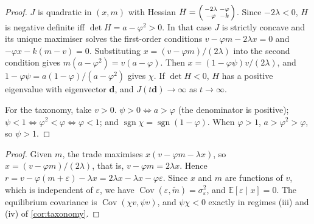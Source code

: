 \documentclass{article}
\theoremstyle{plain}
\theoremstyle{definition}
\theoremstyle{remark}
\newcommand{\E}{\mathbb{E}}
\DeclareMathOperator{\sgn}{sgn}
\DeclareMathOperator{\Cov}{Cov}
\begin{document}
\thmspeech*
\begin{proof}
$J$ is quadratic in $(x,m)$ with Hessian $H=\begin{psmallmatrix}-2\lambda&-\varphi\\-\varphi&-k\end{psmallmatrix}$. Since $-2\lambda<0$, $H$ is negative definite iff $\det H=a-\varphi^2>0$. In that case $J$ is strictly concave and its unique maximiser solves the first-order conditions $v-\varphi m-2\lambda x=0$ and $-\varphi x-k(m-v)=0$. Substituting $x=(v-\varphi m)/(2\lambda)$ into the second condition gives $m(a-\varphi^2)=v(a-\varphi)$. Then $x=(1-\varphi\psi)v/(2\lambda)$, and $1-\varphi\psi=a(1-\varphi)/(a-\varphi^2)$ gives $\chi$. If $\det H<0$, $H$ has a positive eigenvalue with eigenvector $\bm d$, and $J(t\bm d)\to\infty$ as $t\to\infty$.

For the taxonomy, take $v>0$.
$\psi>0\iff a>\varphi$ (the denominator is positive); $\psi<1\iff\varphi^2<\varphi\iff\varphi<1$; and $\sgn\chi=\sgn(1-\varphi)$. When $\varphi>1$, $a>\varphi^2>\varphi$, so $\psi>1$.
\end{proof}

\thmidentity*
\begin{proof}
Given $m$, the trade maximises $x(v-\varphi m-\lambda x)$, so $x=(v-\varphi m)/(2\lambda)$, that is, $v-\varphi m=2\lambda x$. Hence $r=v-\varphi(m+\varepsilon)-\lambda x=2\lambda x-\lambda x-\varphi\varepsilon$. Since $x$ and $m$ are functions of $v$, which is independent of $\varepsilon$, we have $\Cov(\varepsilon,\tilde m)=\sigma_\varepsilon^2$, and $\E[\varepsilon\mid x]=0$. The equilibrium covariance is $\Cov(\chi v,\psi v)$, and $\psi\chi<0$ exactly in regimes (iii) and (iv) of \cref{cor:taxonomy}.
\end{proof}
\end{document}
